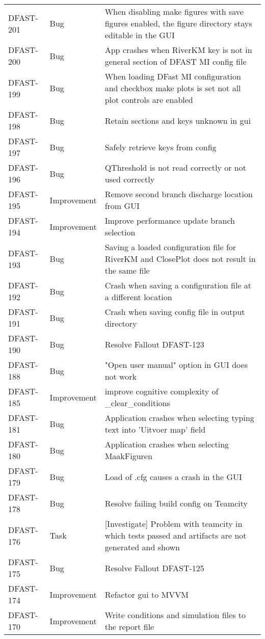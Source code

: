 \documentclass[git]{deltares_manual}
\begin{document}
\begin{longtable}{l|l|p{8cm}}
DFAST-201 & Bug & When disabling make figures with save figures enabled, the figure directory stays editable in the GUI \\
DFAST-200 & Bug & App crashes when RiverKM key is not in general section of DFAST MI config file \\
DFAST-199 & Bug & When loading DFast MI configuration and checkbox make plots is set not all plot controls are enabled \\
DFAST-198 & Bug & Retain sections and keys unknown in gui \\
DFAST-197 & Bug & Safely retrieve keys from config \\
DFAST-196 & Bug & QThreshold is not read correctly or not used correctly \\
DFAST-195 & Improvement & Remove second branch discharge location from GUI \\
DFAST-194 & Improvement & Improve performance update branch selection \\
DFAST-193 & Bug & Saving a loaded configuration file for RiverKM and ClosePlot does not result in the same file \\
DFAST-192 & Bug & Crash when saving a configuration file at a different location \\
DFAST-191 & Bug & Crash when saving config file in output directory \\
DFAST-190 & Bug & Resolve Fallout DFAST-123 \\
DFAST-188 & Bug & "Open user manual" option in GUI does not work \\
DFAST-185 & Improvement & improve cognitive complexity of \_clear\_conditions \\
DFAST-181 & Bug & Application crashes when selecting typing text into 'Uitvoer map' field \\
DFAST-180 & Bug & Application crashes when selecting MaakFiguren \\
DFAST-179 & Bug & Load of .cfg causes a crash in the GUI \\
DFAST-178 & Bug & Resolve failing build config on Teamcity \\
DFAST-176 & Task & [Investigate] Problem with teamcity in which tests passed and artifacts are not generated and shown \\
DFAST-175 & Bug & Resolve Fallout DFAST-125  \\
DFAST-174 & Improvement & Refactor gui to MVVM \\
DFAST-170 & Improvement & Write conditions and simulation files to the report file \\

\end{longtable}
\end{document}
